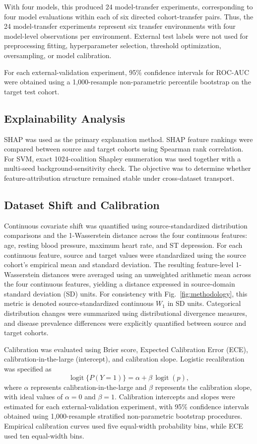 \documentclass[10pt,journal,twocolumn]{IEEEtran}
\begin{document}
With four models, this produced 24 model-transfer experiments, corresponding to four model evaluations within each of six directed cohort-transfer pairs. Thus, the 24 model-transfer experiments represent six transfer environments with four model-level observations per environment. External test labels were not used for preprocessing fitting, hyperparameter selection, threshold optimization, oversampling, or model calibration.

For each external-validation experiment, 95\% confidence intervals for ROC-AUC were obtained using a 1,000-resample non-parametric percentile bootstrap on the target test cohort.

\subsection{Explainability Analysis}

SHAP was used as the primary explanation method. SHAP feature rankings were compared between source and target cohorts using Spearman rank correlation. For SVM, exact 1024-coalition Shapley enumeration was used together with a multi-seed background-sensitivity check. The objective was to determine whether feature-attribution structure remained stable under cross-dataset transport.

\subsection{Dataset Shift and Calibration}

Continuous covariate shift was quantified using source-standardized distribution comparisons and the 1-Wasserstein distance across the four continuous features: age, resting blood pressure, maximum heart rate, and ST depression. For each continuous feature, source and target values were standardized using the source cohort's empirical mean and standard deviation. The resulting feature-level 1-Wasserstein distances were averaged using an unweighted arithmetic mean across the four continuous features, yielding a distance expressed in source-domain standard deviation (SD) units. For consistency with Fig.~\ref{fig:methodology}, this metric is denoted source-standardized continuous $W_1$ in SD units. Categorical distribution changes were summarized using distributional divergence measures, and disease prevalence differences were explicitly quantified between source and target cohorts.

Calibration was evaluated using Brier score, Expected Calibration Error (ECE), calibration-in-the-large (intercept), and calibration slope. Logistic recalibration was specified as
\[
\operatorname{logit}\{P(Y=1)\}=\alpha+\beta\,\operatorname{logit}(\hat{p}),
\]
where $\alpha$ represents calibration-in-the-large and $\beta$ represents the calibration slope, with ideal values of $\alpha=0$ and $\beta=1$. Calibration intercepts and slopes were estimated for each external-validation experiment, with 95\% confidence intervals obtained using 1,000-resample stratified non-parametric bootstrap procedures. Empirical calibration curves used five equal-width probability bins, while ECE used ten equal-width bins.
\end{document}
